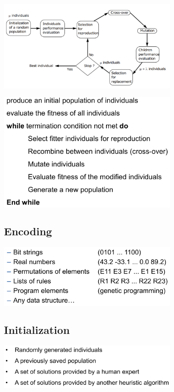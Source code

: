 \documentclass[10pt,a4paper,twocolumn]{article}
\begin{document}
\begin{center}
	\includegraphics[width=9cm]{images/genetic-alg-scheme}
\end{center}

\begin{center}
	\includegraphics[width=9cm]{images/genetic-pseudo}
\end{center}


\subsection{Encoding}
\begin{center}
	\includegraphics[width=9cm]{images/genetc-encoding}
\end{center}


\subsection{Initialization}
\begin{center}
	\includegraphics[width=9cm]{images/genetic-initialization}
\end{center}
\end{document}
